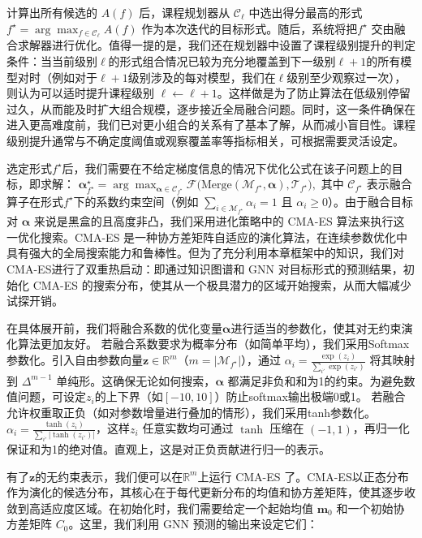 \documentclass[../main.tex]{subfiles}
\begin{document}
计算出所有候选的 $A(f)$ 后，课程规划器从 $\mathcal{C}_\ell$ 中选出得分最高的形式$f^\star = \arg\max_{f\in\mathcal{C}_\ell} A(f)$ 作为本次迭代的目标形式。随后，系统将把$f^\star$ 交由融合求解器进行优化。值得一提的是，我们还在规划器中设置了课程级别提升的判定条件：当当前级别$\ell$的形式组合情况已较为充分地覆盖到下一级别$\ell+1$的所有模型对时（例如对于$\ell+1$级别涉及的每对模型，我们在$\ell$级别至少观察过一次），则认为可以适时提升课程级别 $\ell \leftarrow \ell+1$。这样做是为了防止算法在低级别停留过久，从而能及时扩大组合规模，逐步接近全局融合问题。同时，这一条件确保在进入更高难度前，我们已对更小组合的关系有了基本了解，从而减小盲目性。课程级别提升通常与不确定度阈值或观察覆盖率等指标相关，可根据需要灵活设定。

\label{sec:ch5-5-2-knowledge-guided-evolutionary-solver}
选定形式$f^\star$后，我们需要在不给定梯度信息的情况下优化公式在该子问题上的目标，即求解：
$\boldsymbol{\alpha}^\star_{f^\star} = \arg\max_{\boldsymbol{\alpha}\in \mathcal{C}_{f^\star}} \mathcal{F}\Big(\mathrm{Merge}(\mathcal{M}_{f^\star}, \boldsymbol{\alpha}), \mathcal{T}_{f^\star}\Big),$
其中 $\mathcal{C}_{f^\star}$ 表示融合算子在形式$f^\star$下的系数约束空间（例如 $\sum_{i\in \mathcal{M}_{f^\star}} \alpha_i = 1$ 且 $\alpha_i \ge 0$）。由于融合目标对 $\boldsymbol{\alpha}$ 来说是黑盒的且高度非凸，我们采用进化策略中的 CMA-ES 算法来执行这一优化搜索\cite{cmaevolutionstrategy_hansen_2016}。CMA-ES 是一种协方差矩阵自适应的演化算法，在连续参数优化中具有强大的全局搜索能力和鲁棒性。但为了充分利用本章框架中的知识，我们对CMA-ES进行了双重热启动：即通过知识图谱和 GNN 对目标形式的预测结果，初始化 CMA-ES 的搜索分布，使其从一个极具潜力的区域开始搜索，从而大幅减少试探开销。

在具体展开前，我们将融合系数的优化变量$\boldsymbol{\alpha}$进行适当的参数化，使其对无约束演化算法更加友好。
若融合系数要求为概率分布（如简单平均），我们采用Softmax参数化。引入自由参数向量$\mathbf{z}\in \mathbb{R}^m$（$m=|\mathcal{M}_{f^\star}|$），通过 $\alpha_i = \frac{\exp(z_i)}{\sum_{i'} \exp(z_{i'})}$ 将其映射到 $\Delta^{m-1}$ 单纯形。这确保无论如何搜索，$\boldsymbol{\alpha}$ 都满足非负和和为1的约束。为避免数值问题，可设定$z_i$的上下界（如$[-10,10]$）防止softmax输出极端0或1。
若融合允许权重取正负（如对参数增量进行叠加的情形），我们采用tanh参数化。$\alpha_i = \frac{\tanh(z_i)}{\sum_{i'}|\tanh(z_{i'})|}$，这样$z_i$ 任意实数均可通过 $\tanh$ 压缩在 $(-1,1)$，再归一化保证和为1的绝对值。直观上，这是对正负贡献进行归一的表示。

有了$\mathbf{z}$的无约束表示，我们便可以在$\mathbb{R}^m$上运行 CMA-ES 了。CMA-ES以正态分布作为演化的候选分布，其核心在于每代更新分布的均值和协方差矩阵，使其逐步收敛到高适应度区域。在初始化时，我们需要给定一个起始均值 $\mathbf{m}_0$ 和一个初始协方差矩阵 $C_0$。这里，我们利用 GNN 预测的输出来设定它们：
\end{document}
